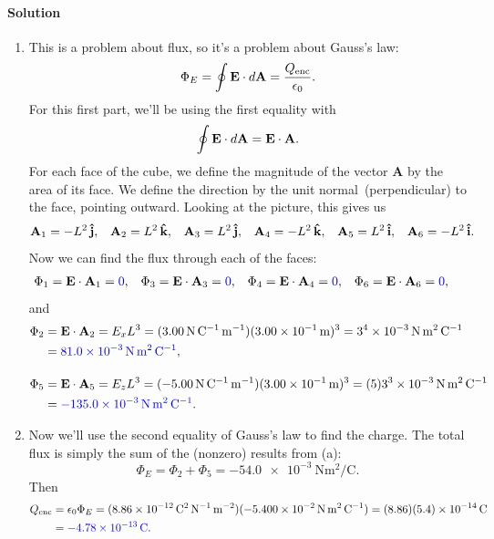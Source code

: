 \documentclass[11pt]{article}
\newcommand{\beq}{\begin{equation*}}
\newcommand{\eeq}{\end{equation*}}
\newenvironment{solution}
{
    \paragraph{Solution}
    \ignorespaces
}
{
    \bigskip
}
\renewcommand{\vec}[1]{\mathbf{#1}}
\begin{document}
\newcommand{\PhiE}{\Phi_E}
\newcommand{\Qenc}{Q_\text{enc}}
\newcommand{\vA}{\vec{A}}
\newcommand{\jh}{\vec{\hat{j}}}
\newcommand{\kh}{\vec{\hat{k}}}

\begin{solution}
	\begin{enumerate}
		\item This is a problem about flux, so it's a problem about Gauss's law:
		\beq
			\PhiE = \oint \vE \cdot \dd{\vA} = \frac{\Qenc}{\ent}.
		\eeq
		For this first part, we'll be using the first equality with
		\beq
			\oint \vE \cdot \dd{\vA} = \vE \cdot \vA.
		\eeq
		For each face of the cube, we define the magnitude of the vector $\vA$ by the area of its face.  We define the direction by the unit normal~(perpendicular) to the face, pointing outward.  Looking at the picture, this gives us
		\begin{align*}
			\vA_1 &= - L^2 \,\jh, &
			\vA_2 &= L^2 \,\kh, &
			\vA_3 &= L^2 \,\jh, &
			\vA_4 &= -L^2 \,\kh, &
			\vA_5 &= L^2 \,\ih, &
			\vA_6 &= -L^2 \,\ih.
		\end{align*}
		Now we can find the flux through each of the faces:
		\begin{align*}
			\Phi_1 &= \vE \cdot \vA_1 = {\color{blue} 0}, &
			\Phi_3 &= \vE \cdot \vA_3 = {\color{blue} 0}, &
			\Phi_4 &= \vE \cdot \vA_4 = {\color{blue} 0}, &
			\Phi_6 &= \vE \cdot \vA_6 = {\color{blue} 0},
		\end{align*}
		and
		\begin{align*}
			\Phi_2 &= \vE \cdot \vA_2
			= \Ex L^3
			= (\SI{3.00}{\newton\per\coulomb\per\meter}) (\SI{3.00e-1}{\meter})^3 = 3^4 \times \SI{e-3}{\newton\square\meter\per\coulomb} \\
			&= {\color{blue} \SI{81.0e-3}{\newton\square\meter\per\coulomb}}, \\[1em]
			\Phi_5 &= \vE \cdot \vA_5
			= E_z L^3
			= (\SI{-5.00}{\newton\per\coulomb\per\meter}) (\SI{3.00e-1}{\meter})^3 = (5) 3^3 \times \SI{e-3}{\newton\square\meter\per\coulomb} \\
			&= {\color{blue} \SI{-135.0e-3}{\newton\square\meter\per\coulomb}}.
		\end{align*}
		
		\item Now we'll use the second equality of Gauss's law to find the charge.  The total flux is simply the sum of the (nonzero) results from (a):
		\beq
			\PhiE = \Phi_2 + \Phi_5 = \SI{-54.0e-3}{\newton\square\meter\per\coulomb}.
		\eeq
		Then
		\begin{align*}
			\Qenc &= \ent \PhiE
			= (\SI{8.86e-12}{\square\coulomb\per\newton\per\square\meter}) (\SI{-5.400e-2}{\newton\square\meter\per\coulomb})
			= (8.86) (5.4) \times \SI{e-14}{\coulomb} \\
			&= {\color{blue} \SI{-4.78e-13}{\coulomb}}.
		\end{align*}
	\end{enumerate}
\end{solution}
\end{document}
